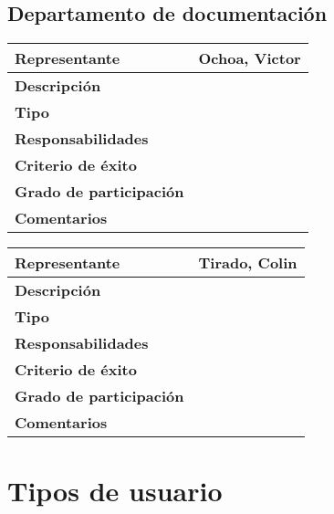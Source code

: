     \subsection{Departamento de documentación}

        \begin{tabular}{|p{4cm}|p{12cm}|}
            \hline \textbf{Representante} & Ochoa, Victor \\
            \hline \textbf{Descripción} &  \\
            \hline \textbf{Tipo} &  \\
            \hline \textbf{Responsabilidades} &  \\
            \hline \textbf{Criterio de éxito} &  \\
            \hline \textbf{Grado de participación} &  \\
            \hline \textbf{Comentarios} &  \\
            \hline
        \end{tabular}


        \begin{tabular}{|p{4cm}|p{12cm}|}
            \hline \textbf{Representante} & Tirado, Colin \\
            \hline \textbf{Descripción} &  \\
            \hline \textbf{Tipo} &  \\
            \hline \textbf{Responsabilidades} &  \\
            \hline \textbf{Criterio de éxito} &  \\
            \hline \textbf{Grado de participación} &  \\
            \hline \textbf{Comentarios} &  \\
            \hline
        \end{tabular}

\section{Tipos de usuario}

